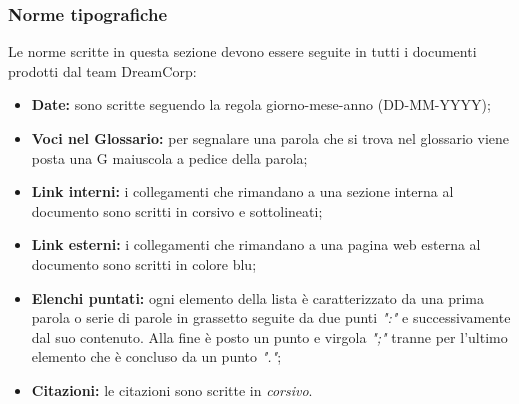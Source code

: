 		\subsubsection{Norme tipografiche}
			Le norme scritte in questa sezione devono essere seguite in tutti i documenti prodotti dal team DreamCorp:
			\begin{itemize}
				\item \textbf{Date:} sono scritte seguendo la regola giorno-mese-anno (DD-MM-YYYY);
				\item \textbf{Voci nel Glossario:} per segnalare una parola che si trova nel glossario viene posta una G maiuscola a pedice della parola;
				\item \textbf{Link interni:} i collegamenti che rimandano a una sezione interna al documento sono scritti in corsivo e sottolineati;
				\item \textbf{Link esterni:} i collegamenti che rimandano a una pagina web esterna al documento sono scritti in colore blu;
				\item \textbf{Elenchi puntati:} ogni elemento della lista è caratterizzato da una prima parola o serie di parole in grassetto seguite da due punti \textit{":"} e successivamente dal suo contenuto. Alla fine è posto un punto e virgola \textit{";"} tranne per l'ultimo elemento che è concluso da un punto \textit{"."};
				\item \textbf{Citazioni:} le citazioni sono scritte in \textit{corsivo}.
			\end{itemize}
